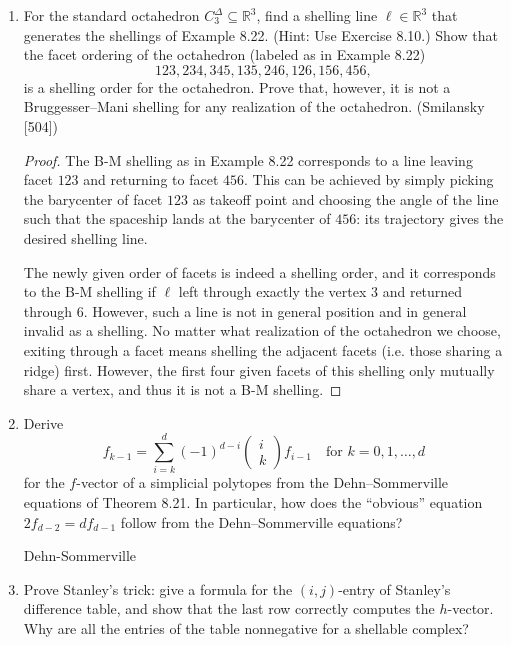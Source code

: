 \documentclass{article}
\begin{document}
\begin{enumerate}
\item For the standard octahedron $C_3^\Delta\subseteq \mathbb{R}^3$, find a shelling line $\ell\in \mathbb{R}^3$ that generates the shellings of Example 8.22. (Hint: Use Exercise 8.10.) Show that the facet ordering of the octahedron (labeled as in Example 8.22)
\[
123, 234, 345, 135, 246, 126, 156, 456,
\]
is a shelling order for the octahedron. Prove that, however, it is not a Bruggesser--Mani shelling for any realization of the octahedron. (Smilansky [504])

\begin{proof}
The B-M shelling as in Example 8.22 corresponds to a line leaving facet $123$ and returning to facet $456$. This can be achieved by simply picking the barycenter of facet $123$ as takeoff point and choosing the angle of the line such that the spaceship lands at the barycenter of $456$: its trajectory gives the desired shelling line.

The newly given order of facets is indeed a shelling order, and it corresponds to the B-M shelling if $\ell$ left through exactly the vertex $3$ and returned through $6$. However, such a line is not in general position and in general invalid as a shelling. No matter what realization of the octahedron we choose, exiting through a facet means shelling the adjacent facets (i.e. those sharing a ridge) first. However, the first four given facets of this shelling only mutually share a vertex, and thus it is not a B-M shelling.
\end{proof}

\item Derive
\[
f_{k-1}=\sum_{i=k}^{d}(-1)^{d-i}\begin{pmatrix} i \\ k \end{pmatrix}f_{i-1}\quad \text{for }k=0,1,\dots,d
\]
for the $f$-vector of a simplicial polytopes from the Dehn--Sommerville equations of Theorem 8.21. In particular, how does the ``obvious'' equation $2f_{d-2}=df_{d-1}$ follow from the Dehn--Sommerville equations?

\begin{solution}
Dehn-Sommerville
\end{solution}

\item Prove Stanley's trick: give a formula for the $(i,j)$-entry of Stanley's difference table, and show that the last row correctly computes the $h$-vector. Why are all the entries of the table nonnegative for a shellable complex?


\end{enumerate}
\end{document}
